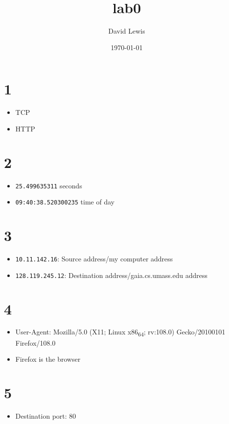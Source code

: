\documentclass[11pt]{article}
\author{David Lewis}
\date{\today}
\title{lab0}
\begin{document}
\maketitle
\section*{1}
\label{sec:org608059c}
\begin{itemize}
\item TCP
\item HTTP
\end{itemize}
\section*{2}
\label{sec:org732826a}
\begin{itemize}
\item \texttt{25.499635311} seconds
\item \texttt{09:40:38.520300235} time of day
\end{itemize}
\section*{3}
\label{sec:org3b96646}
\begin{itemize}
\item \texttt{10.11.142.16}: Source address/my computer address
\item \texttt{128.119.245.12}: Destination address/gaia.cs.umass.edu address
\end{itemize}
\section*{4}
\label{sec:orgaaf9fd8}
\begin{itemize}
\item User-Agent: Mozilla/5.0 (X11; Linux x86\textsubscript{64}; rv:108.0) Gecko/20100101 Firefox/108.0
\item Firefox is the browser
\end{itemize}
\section*{5}
\label{sec:org1dbf330}
\begin{itemize}
\item Destination port: 80
\end{itemize}
\end{document}
